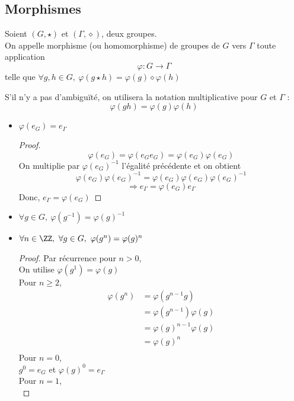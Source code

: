 \documentclass[../main.tex]{subfile}
\begin{document}
\subsection{Morphismes}

\begin{defi}
	Soient $(G, \star)$ et $(\Gamma, \diamond)$, deux groupes.\\
	On appelle morphisme (ou homomorphisme) de groupes de $G$ vers $\Gamma$ toute application 
	$$\varphi : G \to \Gamma$$
	telle que $\forall g, h \in G, \ \varphi(g \star h) = \varphi(g) \diamond \varphi(h)$
\end{defi}

\begin{rema}
	S'il n'y a pas d'ambiguïté, on utilisera la notation multiplicative pour $G$ et $\Gamma$ :
	$$\varphi(gh) = \varphi(g) \varphi(h)$$
\end{rema}

\begin{propri}
\begin{itemize}	
	\item $\varphi(e_G) = e_\Gamma$
\begin{proof}	
	$$\varphi(e_G) = \varphi(e_Ge_G) = \varphi(e_G) \varphi(e_G)$$
	On multiplie par $\varphi(e_G)^{-1}$ l'égalité précédente et on obtient 
	$$\varphi(e_G)\varphi(e_G)^{-1} = \varphi(e_G) \varphi(e_G) \varphi(e_G)^{-1}$$
	$$\Rightarrow e_\Gamma = \varphi(e_G) e_\Gamma$$
	Donc, $e_\Gamma = \varphi(e_G)$
\end{proof}

	\item $\forall g \in G, \ \varphi(g^{-1}) = \varphi(g)^{-1}$

	\item $\forall n \in \ZZ, \ \forall g \in G, \ \varphi(g^n) = \varphi(g)^n$
\begin{proof}	
	Par récurrence pour $n > 0$, \\
	On utilise $\varphi (g^1) = \varphi (g)$\\
	Pour $n \geq 2$, \\
	$$
\begin{aligned}
	\varphi(g^n) &= \varphi(g^{n-1} g)\\
	&= \varphi(g^{n-1}) \varphi(g)\\
	&= \varphi(g)^{n-1} \varphi(g)\\
	&= \varphi(g)^n\\
\end{aligned}
	$$
	Pour $n = 0$, \\
	$g^0 = e_G$ et $\varphi(g)^0 = e_\Gamma$\\
	Pour $n = 1$, \\
\end{proof}
\end{itemize}
\end{propri}
\end{document}
